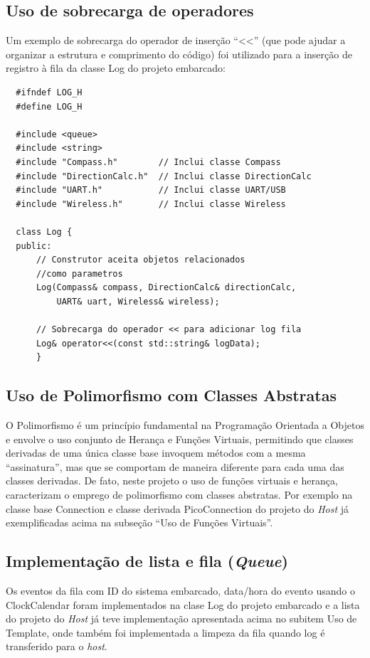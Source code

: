 \documentclass[10pt,twocolumn,letterpaper]{article}
\begin{document}
\subsection{Uso de sobrecarga de operadores}
Um exemplo de sobrecarga do operador de inserção ``<<'' (que pode ajudar a organizar a estrutura e comprimento do código) foi utilizado para a inserção de registro à fila da classe Log do projeto embarcado:
{\scriptsize
\begin{verbatim}
  #ifndef LOG_H
  #define LOG_H
  
  #include <queue>
  #include <string>
  #include "Compass.h"        // Inclui classe Compass
  #include "DirectionCalc.h"  // Inclui classe DirectionCalc
  #include "UART.h"           // Inclui classe UART/USB
  #include "Wireless.h"       // Inclui classe Wireless
  
  class Log {
  public:
      // Construtor aceita objetos relacionados 
      //como parametros
      Log(Compass& compass, DirectionCalc& directionCalc, 
          UART& uart, Wireless& wireless);
  
      // Sobrecarga do operador << para adicionar log fila
      Log& operator<<(const std::string& logData);
      }  
\end{verbatim}
}

\subsection{Uso de Polimorfismo com Classes Abstratas}
O Polimorfismo é um princípio fundamental na Programação Orientada a Objetos e envolve o uso conjunto de Herança e Funções Virtuais, 
permitindo que classes derivadas de uma única classe base invoquem métodos com a mesma ``assinatura'', mas que se comportam de maneira diferente para cada uma das classes derivadas. 
De fato, neste projeto o uso de funções virtuais e herança, caracterizam o emprego de polimorfismo com classes abstratas. Por exemplo na classe base Connection e classe derivada PicoConnection do projeto do \emph{Host} já exemplificadas acima na subseção ``Uso de Funções Virtuais''.


\subsection[short]{Implementação de lista e fila (\emph{Queue})}
Os eventos da fila com ID do sistema embarcado, data/hora do evento usando o 
ClockCalendar foram implementados na clase Log do projeto embarcado e a lista do projeto do \emph{Host} já teve implementação apresentada acima no subitem Uso de Template, onde também foi implementada a limpeza da fila quando log é transferido para o \emph{host}.
\end{document}
